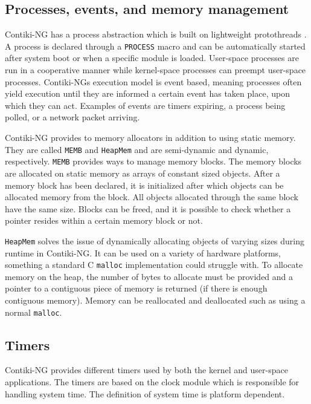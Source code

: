\documentclass[0-thesis.tex]{subfiles}
\begin{document}
\subsection{Processes, events, and memory management}
\label{ssec:process-event-memory}
Contiki-NG has a process abstraction which is built on lightweight protothreads
\parencite{protothreads}. A process is declared through a \texttt{PROCESS} macro and can
be automatically started after system boot or when a specific module is loaded. User-space
processes are run in a cooperative manner while kernel-space processes can preempt
user-space processes. Contiki-NGs execution model is event based, meaning processes often
yield execution until they are informed a certain event has taken place, upon which they
can act. Examples of events are timers expiring, a process being polled, or a network
packet arriving. 

Contiki-NG provides to memory allocators in addition to using static memory. They are
called \texttt{MEMB} and \texttt{HeapMem} and are semi-dynamic and dynamic, respectively.
\texttt{MEMB} provides ways to manage memory blocks. The memory blocks are allocated on
static memory as arrays of constant sized objects. After a memory block has been declared,
it is initialized after which objects can be allocated memory from the block. All objects
allocated through the same block have the same size. Blocks can be freed, and it is
possible to check whether a pointer resides within a certain memory block or not.

\texttt{HeapMem} solves the issue of dynamically allocating objects of varying sizes
during runtime in Contiki-NG. It can be used on a variety of hardware platforms, something
a standard C \texttt{malloc} implementation could struggle with. To allocate memory on the heap,
the number of bytes to allocate must be provided and a pointer to a contiguous piece of
memory is returned (if there is enough contiguous memory). Memory can be reallocated and
deallocated such as using a normal \texttt{malloc}.

\subsection{Timers}
\label{ssec:timers}
Contiki-NG provides different timers used by both the kernel and user-space applications.
The timers are based on the clock module which is responsible for handling system time.
The definition of system time is platform dependent.
\end{document}
